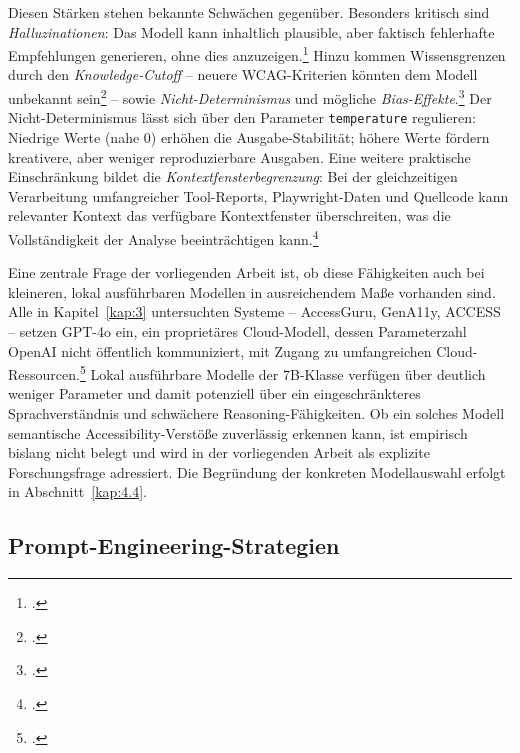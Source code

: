 Diesen Stärken stehen bekannte Schwächen gegenüber. Besonders kritisch sind \textit{\mbox{Halluzinationen}}: Das Modell kann inhaltlich plausible, aber faktisch fehlerhafte Empfehlungen generieren, \mbox{ohne} dies anzuzeigen.\footcite[Vgl.][1:2]{huangSurveyHallucinationLarge2025} Hinzu kommen Wissensgrenzen durch den \textit{Knowledge-Cutoff} -- neuere \ac{WCAG}-Kriterien könnten dem Modell unbekannt sein\footcites[Vgl.][S. 7]{System_Card}[][1:9--10]{huangSurveyHallucinationLarge2025} -- sowie \textit{Nicht-Determinismus} und mögliche \textit{Bias-Effekte}.\footcites[Vgl.][S. 614--615]{benderDangersStochasticParrots2021}[][1:2]{huangSurveyHallucinationLarge2025}[][]{OpenAI_Developers}[][]{anthropic2026claude} Der Nicht-Determinismus lässt sich über den Parameter \texttt{temperature} regulieren: Niedrige Werte (nahe 0) erhöhen die Ausgabe-Stabilität; höhere Werte fördern kreativere, aber weniger reproduzierbare Ausgaben. Eine weitere praktische Einschränkung bildet die \textit{Kontextfensterbegrenzung}: Bei der gleichzeitigen Verarbeitung umfangreicher Tool-Reports, Playwright-Daten und Quellcode kann relevanter Kontext das verfügbare Kontextfenster überschreiten, was die Vollständigkeit der Analyse beeinträchtigen kann.\footcite[Vgl.][S. 146--148]{jurafskyMartinSpeechLanguageProcessing2026}

Eine zentrale Frage der vorliegenden Arbeit ist, ob diese Fähigkeiten auch bei kleineren, lokal ausführbaren Modellen in ausreichendem Maße vorhanden sind. Alle in Kapitel~\ref{kap:3} untersuchten Systeme -- AccessGuru, GenA11y, ACCESS -- setzen GPT-4o ein, ein proprietäres Cloud-Modell, dessen Parameterzahl OpenAI nicht öffentlich kommuniziert, mit Zugang zu umfangreichen Cloud-Ressourcen.\footcites[Vgl.][]{fathallah_accessguru_2025}[][FSE101:10]{he_enhancing_2025}[][S. 7]{huang_access_2024} Lokal ausführbare Modelle der 7B-Klasse verfügen über deutlich weniger Parameter und damit potenziell über ein eingeschränkteres Sprachverständnis und schwächere Reasoning-Fähigkeiten. Ob ein solches Modell semantische Accessibility-Verstöße zuver\-lässig erkennen kann, ist empirisch bislang nicht belegt und wird in der vorliegenden Arbeit als explizite Forschungsfrage adressiert. Die Begründung der konkreten Modellauswahl erfolgt in Abschnitt~\ref{kap:4.4}.

\subsection{Prompt-Engineering-Strategien} \label{Prompt}

